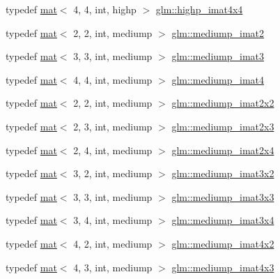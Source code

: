 \begin{DoxyCompactItemize}
\item 
typedef \hyperlink{structglm_1_1mat}{mat}$<$ 4, 4, int, highp $>$ \hyperlink{group__gtc__matrix__integer_gaae7cdd2394ff80ecf1be6d78bfde629a}{glm\+::highp\+\_\+imat4x4}
\item 
typedef \hyperlink{structglm_1_1mat}{mat}$<$ 2, 2, int, mediump $>$ \hyperlink{group__gtc__matrix__integer_ga74e065ab9524e6b7bd5a84cffb758e71}{glm\+::mediump\+\_\+imat2}
\item 
typedef \hyperlink{structglm_1_1mat}{mat}$<$ 3, 3, int, mediump $>$ \hyperlink{group__gtc__matrix__integer_gac6ab7a5cfe157ba8deb79a7691ad8263}{glm\+::mediump\+\_\+imat3}
\item 
typedef \hyperlink{structglm_1_1mat}{mat}$<$ 4, 4, int, mediump $>$ \hyperlink{group__gtc__matrix__integer_ga3ce415f7039ec7f1ad5bffa14d226e80}{glm\+::mediump\+\_\+imat4}
\item 
typedef \hyperlink{structglm_1_1mat}{mat}$<$ 2, 2, int, mediump $>$ \hyperlink{group__gtc__matrix__integer_gafe326375aa42c0abbe571d376f4cbd95}{glm\+::mediump\+\_\+imat2x2}
\item 
typedef \hyperlink{structglm_1_1mat}{mat}$<$ 2, 3, int, mediump $>$ \hyperlink{group__gtc__matrix__integer_ga1e2d944bde5dfe9fe49824c4c3457e30}{glm\+::mediump\+\_\+imat2x3}
\item 
typedef \hyperlink{structglm_1_1mat}{mat}$<$ 2, 4, int, mediump $>$ \hyperlink{group__gtc__matrix__integer_gabc256c695f6fe794f809f2d1ee667d6e}{glm\+::mediump\+\_\+imat2x4}
\item 
typedef \hyperlink{structglm_1_1mat}{mat}$<$ 3, 2, int, mediump $>$ \hyperlink{group__gtc__matrix__integer_gae3f0a14fb81eb2edc0caf5b131adb969}{glm\+::mediump\+\_\+imat3x2}
\item 
typedef \hyperlink{structglm_1_1mat}{mat}$<$ 3, 3, int, mediump $>$ \hyperlink{group__gtc__matrix__integer_ga1304a2da9c3f5937aa8c4684d638d09c}{glm\+::mediump\+\_\+imat3x3}
\item 
typedef \hyperlink{structglm_1_1mat}{mat}$<$ 3, 4, int, mediump $>$ \hyperlink{group__gtc__matrix__integer_gae0ab87609ac842f31be9e581caafa0f0}{glm\+::mediump\+\_\+imat3x4}
\item 
typedef \hyperlink{structglm_1_1mat}{mat}$<$ 4, 2, int, mediump $>$ \hyperlink{group__gtc__matrix__integer_ga536fe339834f7e764672c22c63ec543b}{glm\+::mediump\+\_\+imat4x2}
\item 
typedef \hyperlink{structglm_1_1mat}{mat}$<$ 4, 3, int, mediump $>$ \hyperlink{group__gtc__matrix__integer_ga213644b63e6ee8ac783fd9a75e3c5abb}{glm\+::mediump\+\_\+imat4x3}

\end{DoxyCompactItemize}
